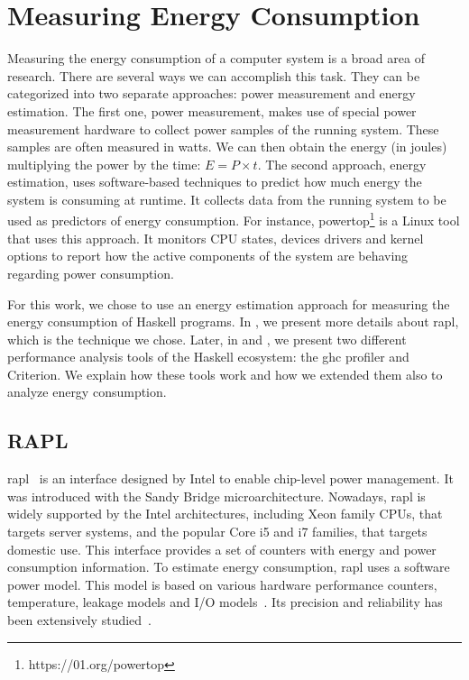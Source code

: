 \chapter{Measuring Energy Consumption}\label{chapter:tools}
Measuring the energy consumption of a computer system is a broad area of research. There are several ways we can accomplish this task. They can be categorized into two separate approaches: power measurement and energy estimation. The first one, power measurement, makes use of special power measurement hardware to collect power samples of the running system. These samples are often measured in watts. We can then obtain the energy (in joules) multiplying the power by the time: $E = P \times t$.
The second approach, energy estimation, uses software-based techniques to predict how much energy the system is consuming at runtime. It collects data from the running system to be used as predictors of energy consumption. For instance, powertop\footnote{https://01.org/powertop} is a Linux tool that uses this approach. It monitors CPU states, devices drivers and kernel options to report how the active components of the system are behaving regarding power consumption.

For this work, we chose to use an energy estimation approach for measuring the energy consumption of Haskell programs. In , we present more details about \acs{rapl}, which is the technique we chose. Later, in  and , we present two different performance analysis tools of the Haskell ecosystem: the \acs{ghc} profiler and Criterion. We explain how these tools work and how we extended them also to analyze energy consumption.

\section{RAPL}\label{sec:rapl}
\ac{rapl}~\citep{david:2010} is an interface designed by Intel to enable chip-level power management. It was introduced with the Sandy Bridge microarchitecture. Nowadays, \acs{rapl} is widely supported by the Intel architectures, including Xeon family CPUs, that targets server systems, and the popular Core i5 and i7 families, that targets domestic use. This interface provides a set of counters with energy and power consumption information. To estimate energy consumption, \acs{rapl} uses a software power model. This model is based on various hardware performance counters, temperature, leakage models and I/O models~\citep{weaver:2012}. Its precision and reliability has been extensively studied~\citep{rotem:2012,hahnel:2012}.

